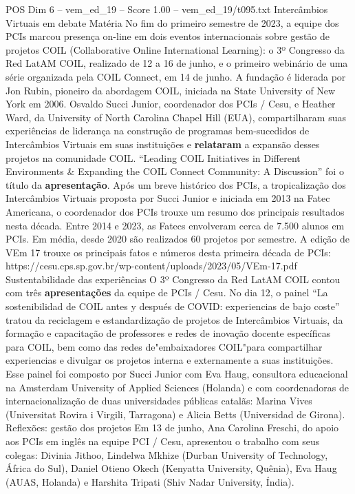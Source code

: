 \begin{textsample}{POS Dim 6 – vem\_ed\_19 – Score 1.00 – vem\_ed\_19/t095.txt}
Intercâmbios Virtuais em debate Matéria No fim do primeiro semestre de 2023, a equipe dos PCIs marcou presença on-line em dois eventos internacionais sobre gestão de projetos COIL (Collaborative Online International Learning): o 3º Congresso da Red LatAM COIL, realizado de 12 a 16 de junho, e o primeiro webinário de uma série organizada pela COIL Connect, em 14 de junho.
A fundação é liderada por Jon Rubin, pioneiro da abordagem COIL, iniciada na State University of New York em 2006.
Osvaldo Succi Junior, coordenador dos PCIs / Cesu, e Heather Ward, da University of North Carolina Chapel Hill (EUA), compartilharam suas experiências de liderança na construção de programas bem-sucedidos de Intercâmbios Virtuais em suas instituições e \textbf{relataram} a expansão desses projetos na comunidade COIL. “Leading COIL Initiatives in Different Environments \& Expanding the COIL Connect Community: A Discussion” foi o título da \textbf{apresentação}.
Após um breve histórico dos PCIs, a tropicalização dos Intercâmbios Virtuais proposta por Succi Junior e iniciada em 2013 na Fatec Americana, o coordenador dos PCIs trouxe um resumo dos principais resultados nesta década.
Entre 2014 e 2023, as Fatecs envolveram cerca de 7.500 alunos em PCIs.
Em média, desde 2020 são realizados 60 projetos por semestre.
A edição de VEm 17 trouxe os principais fatos e números desta primeira década de PCIs: https://cesu.cps.sp.gov.br/wp-content/uploads/2023/05/VEm-17.pdf Sustentabilidade das experiências O 3º Congresso da Red LatAM COIL contou com três \textbf{apresentações} da equipe de PCIs / Cesu.
No dia 12, o painel “La sostenibilidad de COIL antes y después de COVID: experiencias de bajo coste” tratou da reciclagem e estandardização de projetos de Intercâmbios Virtuais, da formação e capacitação de professores e redes de inovação docente específicas para COIL, bem como das redes de"embaixadores COIL"para compartilhar experiencias e divulgar os projetos interna e externamente a suas instituições.
Esse painel foi composto por Succi Junior com Eva Haug, consultora educacional na Amsterdam University of Applied Sciences (Holanda) e com coordenadoras de internacionalização de duas universidades públicas catalãs: Marina Vives (Universitat Rovira i Virgili, Tarragona) e Alicia Betts (Universidad de Girona).
Reflexões: gestão dos projetos Em 13 de junho, Ana Carolina Freschi, do apoio aos PCIs em inglês na equipe PCI / Cesu, apresentou o trabalho com seus colegas: Divinia Jithoo, Lindelwa Mkhize (Durban University of Technology, África do Sul), Daniel Otieno Okech (Kenyatta University, Quênia), Eva Haug (AUAS, Holanda) e Harshita Tripati (Shiv Nadar University, Índia).

\end{textsample}
